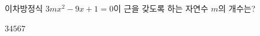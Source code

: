 이차방정식 $3mx^2-9x+1=0$이 근을 갖도록 하는 자연수 $m$의 개수는?
\begin{choices32}{$3$}{$4$}{$5$}{$6$}{$7$}\end{choices32}
